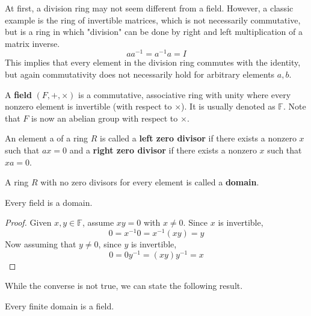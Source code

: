 \documentclass{article}
\begin{document}
    At first, a division ring may not seem different from a field. However, a classic example is the ring of invertible matrices, which is not necessarily commutative, but is a ring in which "division" can be done by right and left multiplication of a matrix inverse. 
    \begin{equation}
      a a^{-1} = a^{-1} a = I
    \end{equation}
    This implies that every element in the division ring commutes with the identity, but again commutativity does not necessarily hold for arbitrary elements $a, b$. 

    \begin{definition}
      A \textbf{field} $(F, +, \times)$ is a commutative, associative ring with unity where every nonzero element is invertible (with respect to $\times$). It is usually denoted as $\mathbb{F}$. Note that $F$ is now an abelian group with respect to $\times$. 
    \end{definition}

    \begin{definition}
      An element a of a ring $R$ is called a \textbf{left zero divisor} if there exists a nonzero $x$ such that $a x = 0$ and a \textbf{right zero divisor} if there exists a nonzero $x$ such that $x a = 0$. 
    \end{definition}

    \begin{definition}
      A ring $R$ with no zero divisors for every element is called a \textbf{domain}. 
    \end{definition}

    \begin{proposition}
      Every field is a domain. 
    \end{proposition}
    \begin{proof}
      Given $x, y \in \mathbb{F}$, assume $x y = 0$ with $x \neq 0$. Since $x$ is invertible,
      \begin{equation}
        0 = x^{-1} 0 = x^{-1} (x y) = y
      \end{equation}
      Now assuming that $y \neq 0$, since $y$ is invertible, 
      \begin{equation}
        0 = 0 y^{-1} = (x y) y^{-1} = x
      \end{equation}
    \end{proof}

    While the converse is not true, we can state the following result. 

    \begin{theorem}
      Every finite domain is a field. 
    \end{theorem}
\end{document}

